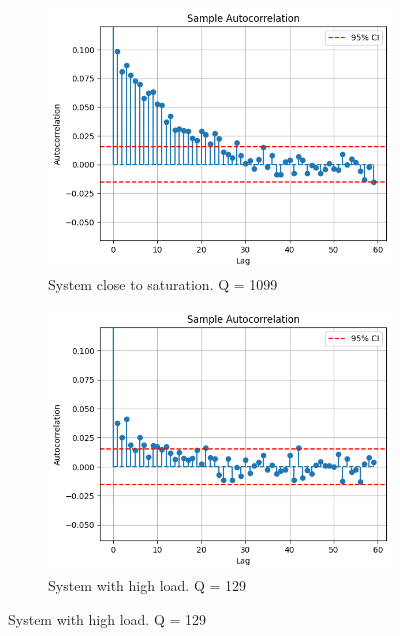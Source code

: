\begin{figure}[H]
    \captionsetup{type=figure}
    \centering
    \begin{subfigure}[b]{0.45\textwidth}
        \includegraphics[width=\textwidth]{./images/04/autoCorHighUnfix.png}
        \caption{System close to saturation. Q = 1099}
        \label{fig:autoCorHighUnfix}
    \end{subfigure}
    \hfill %
    \begin{subfigure}[b]{0.45\textwidth}
        \includegraphics[width=\textwidth]{./images/04/autoCorLowUnfix.png}
        \caption{System with high load. Q = 129}
        \label{fig:autoCorLowUnfix}
    \end{subfigure}
    

\end{figure}
